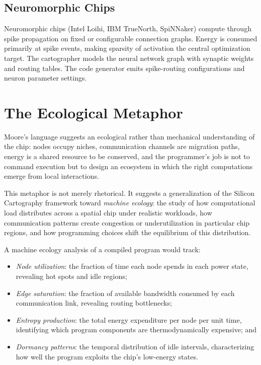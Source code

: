 \documentclass[11pt, a4paper]{article}
\begin{document}
\subsection{Neuromorphic Chips}

Neuromorphic chips (Intel Loihi, IBM TrueNorth, SpiNNaker) compute through
spike propagation on fixed or configurable connection graphs. Energy is consumed
primarily at spike events, making sparsity of activation the central optimization
target. The cartographer models the neural network graph with synaptic weights and
routing tables. The code generator emits spike-routing configurations and
neuron parameter settings.

\section{The Ecological Metaphor}

Moore's language suggests an ecological rather than mechanical understanding of the
chip: nodes occupy niches, communication channels are migration paths, energy is a
shared resource to be conserved, and the programmer's job is not to command execution
but to design an ecosystem in which the right computations emerge from local interactions.

This metaphor is not merely rhetorical. It suggests a generalization of the Silicon
Cartography framework toward \emph{machine ecology}: the study of how computational
load distributes across a spatial chip under realistic workloads, how communication
patterns create congestion or underutilization in particular chip regions, and how
programming choices shift the equilibrium of this distribution.

A machine ecology analysis of a compiled program would track:
\begin{itemize}
  \item \emph{Node utilization}: the fraction of time each node spends in each
        power state, revealing hot spots and idle regions;
  \item \emph{Edge saturation}: the fraction of available bandwidth consumed by
        each communication link, revealing routing bottlenecks;
  \item \emph{Entropy production}: the total energy expenditure per node per unit time,
        identifying which program components are thermodynamically expensive; and
  \item \emph{Dormancy patterns}: the temporal distribution of idle intervals,
        characterizing how well the program exploits the chip's low-energy states.
\end{itemize}
\end{document}
